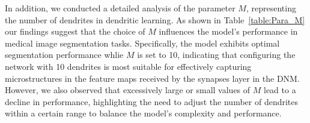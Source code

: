 \documentclass[review]{elsarticle}
\begin{document}
	\begin{table}[!h]
		\centering
		\caption{Parameter analysis results (mean ± std) for parameter $k$ in the BUS Dataset.}
		\label{table:Para_k}
	\end{table}

	In addition, we conducted a detailed analysis of the parameter $ M $, representing the number of dendrites in dendritic learning. As shown in Table~\ref{table:Para_M} our findings suggest that the choice of $ M $ influences the model's performance in medical image segmentation tasks. Specifically, the model exhibits optimal segmentation performance whlie $ M $ is set to 10, indicating that configuring the network with 10 dendrites is most suitable for effectively capturing microstructures in the feature maps received by the synapses layer in the DNM. However, we also observed that excessively large or small values of $ M $ lead to a decline in performance, highlighting the need to adjust the number of dendrites within a certain range to balance the model's complexity and performance.
\end{document}
